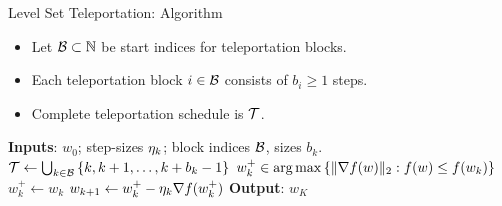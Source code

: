 \documentclass[usenames,dvipsnames,mathserif,notheorems]{beamer}
\newcommand{\good}[1]{\textcolor{good}{#1}}
\begin{document}
\begin{frame}{Level Set Teleportation: Algorithm}

    \begin{itemize}
        \item Let \( \mathcal{B} \subset \mathbb{N} \) be \good{start indices} for teleportation
              blocks.
              \pause

        \item Each \good{teleportation block} \( i \in \mathcal{B} \) consists of \( b_i \geq 1 \)
              steps.
              \pause

        \item Complete \good{teleportation schedule} is \( \mathcal{T} \).
    \end{itemize}
    \pause

    \begin{algorithm}[H]
        \caption{GD with Teleportation}
        \label{alg:gd-with-teleport}
        \begin{algorithmic}
            \STATE \textbf{Inputs}: \( w_0 \); step-sizes \( \eta_k \); block indices \( \mathcal{B} \), sizes \( b_k \).
            \STATE \( \mathcal{T} \gets \bigcup_{k \in \mathcal{B}} \left\{k, k+1, \ldots, k+b_k-1\right\} \)
            \STATE \( w_k^+ \in \mathop{\rm arg\,max} \left\{\|\nabla f(w)\|_2 : f(w) \leq f(w_k)\right\} \)
            \ELSE
            \STATE \( w_k^+ \gets w_k \)
            \ENDIF
            \STATE \( w_{k+1} \gets w_k^+ - \eta_k \nabla f(w_k^+) \)
            \ENDFOR
            \STATE \textbf{Output}: \( w_K \)
        \end{algorithmic}
    \end{algorithm}
\end{frame}
\end{document}
